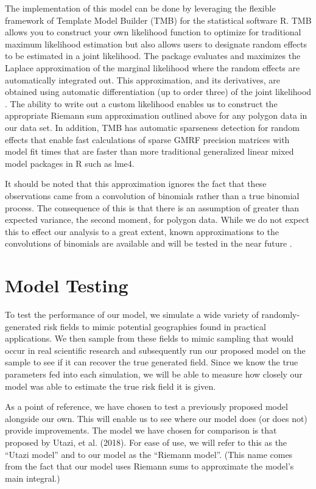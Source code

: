 \documentclass{article}
\begin{document}
The implementation of this model can be done by leveraging the flexible framework of Template Model Builder (TMB) for the statistical software R. TMB allows you to construct your own likelihood function to optimize for traditional maximum likelihood estimation but also allows users to designate random effects to be estimated in a joint likelihood. The package evaluates and maximizes the Laplace approximation of the marginal likelihood where the random effects are automatically integrated out. This approximation, and its derivatives, are obtained using automatic differentiation (up to order three) of the joint likelihood \cite{Kristensen2016a}. The ability to write out a custom likelihood enables us to construct the appropriate Riemann sum approximation outlined above for any polygon data in our data set. In addition, TMB has automatic sparseness detection for random effects that enable fast calculations of sparse GMRF precision matrices with model fit times that are faster than more traditional generalized linear mixed model packages in R such as lme4.

It should be noted that this approximation ignores the fact that these observations came from a convolution of binomials rather than a true binomial process. The consequence of this is that there is an assumption of greater than expected variance, the second moment, for polygon data. While we do not expect this to effect our analysis to a great extent, known approximations to the convolutions of binomials are available and will be tested in the near future \cite{Liu2017}.

\section{Model Testing}\label{model testing}

To test the performance of our model, we simulate a wide variety of randomly-generated risk fields to mimic potential geographies found in practical applications. We then sample from these fields to mimic sampling that would occur in real scientific research and subsequently run our proposed model on the sample to see if it can recover the true generated field. Since we know the true parameters fed into each simulation, we will be able to measure how closely our model was able to estimate the true risk field it is given.

As a point of reference, we have chosen to test a previously proposed model alongside our own. This will enable us to see where our model does (or does not) provide improvements. The model we have chosen for comparison is that proposed by Utazi, et al. (2018). For ease of use, we will refer to this as the ``Utazi model'' and to our model as the ``Riemann model''. (This name comes from the fact that our model uses Riemann sums to approximate the model's main integral.)
\end{document}
